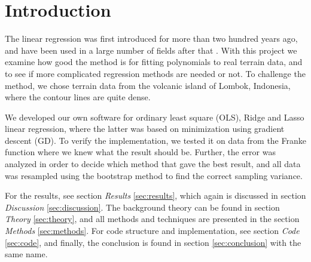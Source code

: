 \section{Introduction} \label{sec:introduction}
The linear regression was first introduced for more than two hundred years ago, and have been used in a large number of fields after that \cite{Gauss}\cite{Legende}. With this project we examine how good the method is for fitting polynomials to real terrain data, and to see if more complicated regression methods are needed or not. To challenge the method, we chose terrain data from the volcanic island of Lombok, Indonesia, where the contour lines are quite dense. 

We developed our own software for ordinary least square (OLS), Ridge and Lasso linear regression, where the latter was based on minimization using gradient descent (GD). To verify the implementation, we tested it on data from the Franke function where we knew what the result should be. Further, the error was analyzed in order to decide which method that gave the best result, and all data was resampled using the bootstrap method to find the correct sampling variance. 

For the results, see section \textit{Results} \eqref{sec:results}, which again is discussed in section \textit{Discussion} \eqref{sec:discussion}. The background theory can be found in section \textit{Theory} \eqref{sec:theory}, and all methods and techniques are presented in the section \textit{Methods} \eqref{sec:methods}. For code structure and implementation, see section \textit{Code} \eqref{sec:code}, and finally, the conclusion is found in section \eqref{sec:conclusion} with the same name.